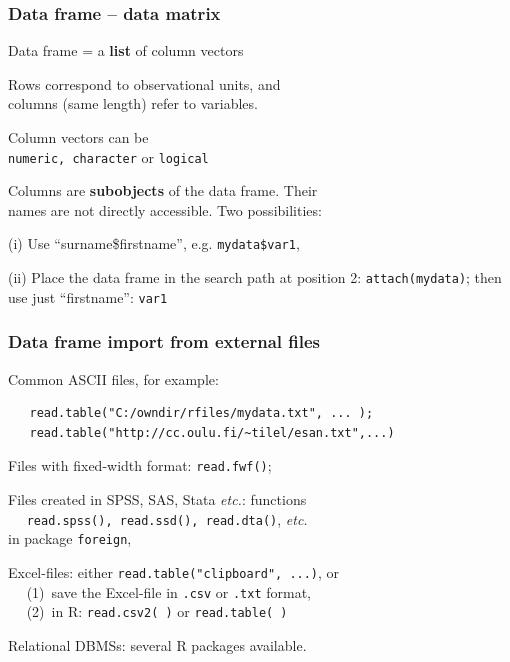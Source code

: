 \documentclass[handout,12pt]{beamer}
\begin{document}
\begin{frame}
\frametitle {Data frame -- data matrix}

\bd
\item[Data frame] = a {\bf list} of column vectors
\ed
\bi
\item Rows correspond to observational units, and \\ columns (same length) refer to variables.
\pause\medskip
\item Column vectors can be \\ {\tt numeric, character} or {\tt logical}
\pause\medskip
\item Columns are \textbf{subobjects} of the data frame. Their \\
names are not directly accessible. Two possibilities:
\bi
 \item[(i)] Use ``surname\$firstname'', e.g. {\tt mydata\$var1}, 
 \pause\medskip
 \item[(ii)] Place the data frame in the search path at position 2: 
  {\tt attach(mydata)}; then use just ``firstname'': {\tt var1}
\ei
\ei
\end{frame}

\begin{frame}[fragile]
\frametitle{Data frame import from external files}

\bi
\item Common ASCII files, for example: \\
 \small 
\begin{verbatim}
   read.table("C:/owndir/rfiles/mydata.txt", ... );
   read.table("http://cc.oulu.fi/~tilel/esan.txt",...)
\end{verbatim}    
 \normalsize
\pause 
\item Files with fixed-width format: {\tt read.fwf()};
\pause\medskip
\item Files created in SPSS, SAS, Stata \emph{etc.}: 
functions \\
$\quad$ {\tt read.spss(), read.ssd(), read.dta()}, \emph{etc.} \\
in package {\tt foreign},
 \pause\medskip 
\item Excel-files: either {\tt read.table("clipboard", ...)}, or\\
 $\quad$ (1)\ save the Excel-file in {\tt .csv} or {\tt .txt} format, \\
 $\quad$ (2)\ in R: {\tt read.csv2( )} or {\tt read.table( )}
 \pause\medskip 
\item Relational DBMSs:  several R packages available.
\ei
\end{frame}
\end{document}
